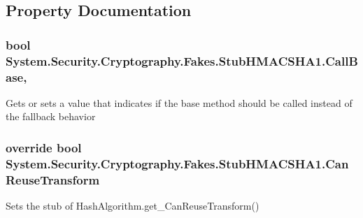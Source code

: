 \subsection{Property Documentation}
\hypertarget{class_system_1_1_security_1_1_cryptography_1_1_fakes_1_1_stub_h_m_a_c_s_h_a1_a12d7539ef3379dd554862f4aba7ed2cb}{
\subsubsection[{Call\-Base}]{\setlength{\rightskip}{0pt plus 5cm}bool System.\-Security.\-Cryptography.\-Fakes.\-Stub\-H\-M\-A\-C\-S\-H\-A1.\-Call\-Base\hspace{0.3cm}{\ttfamily [get]}, {\ttfamily [set]}}}\label{class_system_1_1_security_1_1_cryptography_1_1_fakes_1_1_stub_h_m_a_c_s_h_a1_a12d7539ef3379dd554862f4aba7ed2cb}


Gets or sets a value that indicates if the base method should be called instead of the fallback behavior

\hypertarget{class_system_1_1_security_1_1_cryptography_1_1_fakes_1_1_stub_h_m_a_c_s_h_a1_af4106211990ab8dac4b1fd2f71df1ebd}{
\subsubsection[{Can\-Reuse\-Transform}]{\setlength{\rightskip}{0pt plus 5cm}override bool System.\-Security.\-Cryptography.\-Fakes.\-Stub\-H\-M\-A\-C\-S\-H\-A1.\-Can\-Reuse\-Transform\hspace{0.3cm}{\ttfamily [get]}}}\label{class_system_1_1_security_1_1_cryptography_1_1_fakes_1_1_stub_h_m_a_c_s_h_a1_af4106211990ab8dac4b1fd2f71df1ebd}


Sets the stub of Hash\-Algorithm.\-get\-\_\-\-Can\-Reuse\-Transform()

